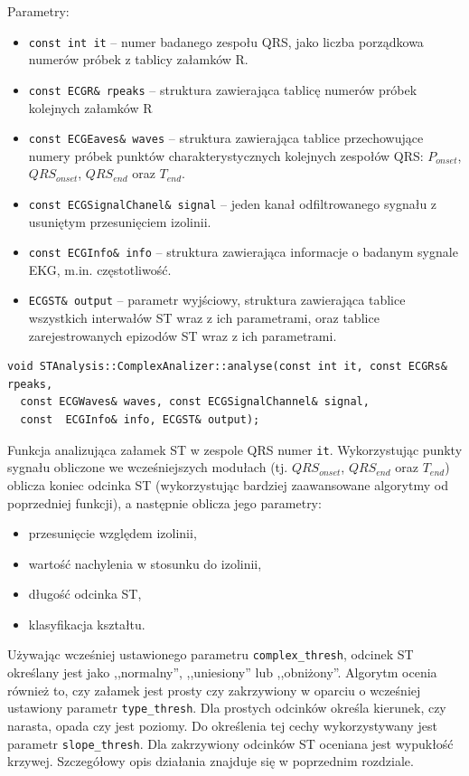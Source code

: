 \documentclass[a4paper, 11pt]{article}
\begin{document}
Parametry:
\begin{itemize}
  \item \verb|const int it| -- numer badanego zespołu QRS, jako liczba
    porządkowa numerów próbek z tablicy załamków R.
  \item \verb|const ECGR& rpeaks| -- struktura zawierająca tablicę numerów
    próbek kolejnych załamków R
  \item \verb|const ECGEaves& waves| -- struktura zawierająca tablice
    przechowujące numery próbek punktów charakterystycznych kolejnych zespołów
    QRS: $P_{onset}$, $QRS_{onset}$, $QRS_{end}$ oraz $T_{end}$.
  \item \verb|const ECGSignalChanel& signal| -- jeden kanał odfiltrowanego
    sygnału z usuniętym przesunięciem izolinii.
  \item \verb|const ECGInfo& info| -- struktura zawierająca informacje o badanym
    sygnale EKG, m.in. częstotliwość.
  \item \verb|ECGST& output| -- parametr wyjściowy, struktura zawierająca
    tablice wszystkich interwałów ST wraz z ich parametrami, oraz tablice
    zarejestrowanych epizodów ST wraz z ich parametrami.
\end{itemize}

\begin{lstlisting}
void STAnalysis::ComplexAnalizer::analyse(const int it, const ECGRs& rpeaks,
  const ECGWaves& waves, const ECGSignalChannel& signal,
  const  ECGInfo& info, ECGST& output);
\end{lstlisting}

Funkcja analizująca załamek ST w zespole QRS numer \verb|it|. Wykorzystując
punkty sygnału obliczone we wcześniejszych modułach (tj. $QRS_{onset}$,
$QRS_{end}$ oraz $T_{end}$) oblicza koniec odcinka ST (wykorzystując bardziej
zaawansowane algorytmy od poprzedniej funkcji), a następnie oblicza jego parametry:
\begin{itemize}
  \item przesunięcie względem izolinii,
  \item wartość nachylenia w stosunku do izolinii,
  \item długość odcinka ST,
  \item klasyfikacja kształtu.
\end{itemize}
Używając wcześniej ustawionego parametru \verb|complex_thresh|, odcinek ST
określany jest jako ,,normalny'', ,,uniesiony'' lub ,,obniżony''. Algorytm
ocenia również to, czy załamek jest prosty czy zakrzywiony w oparciu o
wcześniej ustawiony parametr \verb|type_thresh|. Dla prostych odcinków określa
kierunek, czy narasta, opada czy jest poziomy. Do określenia tej cechy
wykorzystywany jest parametr \verb|slope_thresh|. Dla zakrzywiony odcinków ST
oceniana jest wypukłość krzywej. Szczegółowy opis działania znajduje się w
poprzednim rozdziale.
\end{document}
